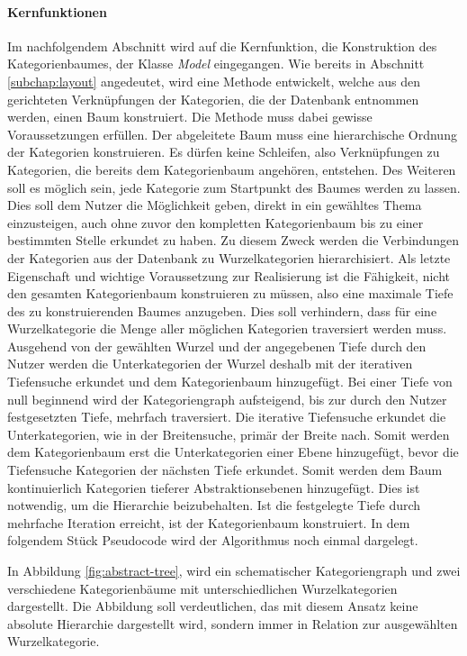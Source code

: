 \paragraph{Kernfunktionen}
Im nachfolgendem Abschnitt wird auf die Kernfunktion, die Konstruktion des Kategorienbaumes, der Klasse \emph{Model} eingegangen.
Wie bereits in Abschnitt \ref{subchap:layout} angedeutet, wird eine Methode entwickelt, welche aus den gerichteten Verknüpfungen der Kategorien, die der Datenbank entnommen werden, einen Baum konstruiert.
Die Methode muss dabei gewisse Voraussetzungen erfüllen.
Der abgeleitete Baum muss eine hierarchische Ordnung der Kategorien konstruieren.
Es dürfen keine Schleifen, also Verknüpfungen zu Kategorien, die bereits dem Kategorienbaum angehören, entstehen.
Des Weiteren soll es möglich sein, jede Kategorie zum Startpunkt des Baumes werden zu lassen.
Dies soll dem Nutzer die Möglichkeit geben, direkt in ein gewähltes Thema einzusteigen, auch ohne zuvor den kompletten Kategorienbaum bis zu einer bestimmten Stelle erkundet zu haben.
Zu diesem Zweck werden die Verbindungen der Kategorien aus der Datenbank zu Wurzelkategorien hierarchisiert.
Als letzte Eigenschaft und wichtige Voraussetzung zur Realisierung ist die Fähigkeit, nicht den gesamten Kategorienbaum konstruieren zu müssen, also eine maximale Tiefe des zu konstruierenden Baumes anzugeben.
Dies soll verhindern, dass für eine Wurzelkategorie die Menge aller möglichen Kategorien traversiert werden muss.
Ausgehend von der gewählten Wurzel und der angegebenen Tiefe durch den Nutzer werden die Unterkategorien der Wurzel deshalb mit der iterativen Tiefensuche erkundet und dem Kategorienbaum hinzugefügt.
Bei einer Tiefe von null beginnend wird der Kategoriengraph aufsteigend, bis zur durch den Nutzer festgesetzten Tiefe, mehrfach traversiert.
Die iterative Tiefensuche erkundet die Unterkategorien, wie in der Breitensuche, primär der Breite nach. Somit werden dem Kategorienbaum erst die Unterkategorien einer Ebene hinzugefügt, bevor die Tiefensuche Kategorien der nächsten Tiefe erkundet.
Somit werden dem Baum kontinuierlich Kategorien tieferer Abstraktionsebenen hinzugefügt. Dies ist notwendig, um die Hierarchie beizubehalten.
Ist die festgelegte Tiefe durch mehrfache Iteration erreicht, ist der Kategorienbaum konstruiert.
In dem folgendem Stück Pseudocode wird der Algorithmus noch einmal dargelegt.

In Abbildung \ref{fig:abstract-tree}, wird ein schematischer Kategoriengraph und zwei verschiedene Kategorienbäume mit unterschiedlichen Wurzelkategorien dargestellt.
Die Abbildung soll verdeutlichen, das mit diesem Ansatz keine absolute Hierarchie dargestellt wird, sondern immer in Relation zur ausgewählten Wurzelkategorie.

